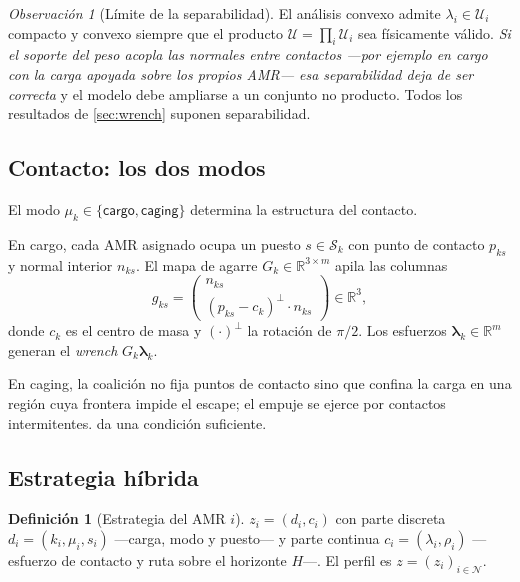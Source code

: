 \documentclass[11pt,a4paper]{article}
\theoremstyle{plain}
\theoremstyle{definition}
\newtheorem{definicion}[teorema]{Definición}
\theoremstyle{remark}
\newtheorem{observacion}[teorema]{Observación}
\newcommand{\Rb}{\mathbb{R}}
\newcommand{\Ncal}{\mathcal{N}}
\newcommand{\Scal}{\mathcal{S}}
\newcommand{\Ucal}{\mathcal{U}}
\begin{document}
\begin{observacion}[Límite de la separabilidad]
\label{obs:separabilidad}
El análisis convexo admite $\lambda_i\in\Ucal_i$ compacto y convexo siempre que
el producto $\Ucal=\prod_i\Ucal_i$ sea físicamente válido. \emph{Si el soporte
del peso acopla las normales entre contactos —por ejemplo en \textsf{cargo} con
la carga apoyada sobre los propios AMR— esa separabilidad deja de ser correcta}
y el modelo debe ampliarse a un conjunto no producto. Todos los resultados de
\cref{sec:wrench} suponen separabilidad.
\end{observacion}

\subsection{Contacto: los dos modos}

El modo $\mu_k\in\{\textsf{cargo},\textsf{caging}\}$ determina la estructura del
contacto.

En \textsf{cargo}, cada AMR asignado ocupa un puesto $s\in\Scal_k$ con punto de
contacto $p_{ks}$ y normal interior $n_{ks}$. El mapa de agarre
$G_k\in\Rb^{3\times m}$ apila las columnas
\begin{equation}
  g_{ks}=\begin{pmatrix} n_{ks}\\ (p_{ks}-c_k)^{\perp}\!\cdot n_{ks}\end{pmatrix}
  \in\Rb^{3},
  \label{eq:columna}
\end{equation}
donde $c_k$ es el centro de masa y $(\cdot)^\perp$ la rotación de $\pi/2$. Los
esfuerzos $\bm\lambda_k\in\Rb^{m}$ generan el \emph{wrench}
$G_k\bm\lambda_k$.

En \textsf{caging}, la coalición no fija puntos de contacto sino que confina la
carga en una región cuya frontera impide el escape; el empuje se ejerce por
contactos intermitentes.  da una condición suficiente.

\subsection{Estrategia híbrida}

\begin{definicion}[Estrategia del AMR $i$]
\label{def:estrategia}
$z_i=(d_i,c_i)$ con parte discreta $d_i=(k_i,\mu_i,s_i)$ —carga, modo y
puesto— y parte continua $c_i=(\lambda_i,\rho_i)$ —esfuerzo de contacto y ruta
sobre el horizonte $H$—. El perfil es $z=(z_i)_{i\in\Ncal}$.
\end{definicion}
\end{document}
